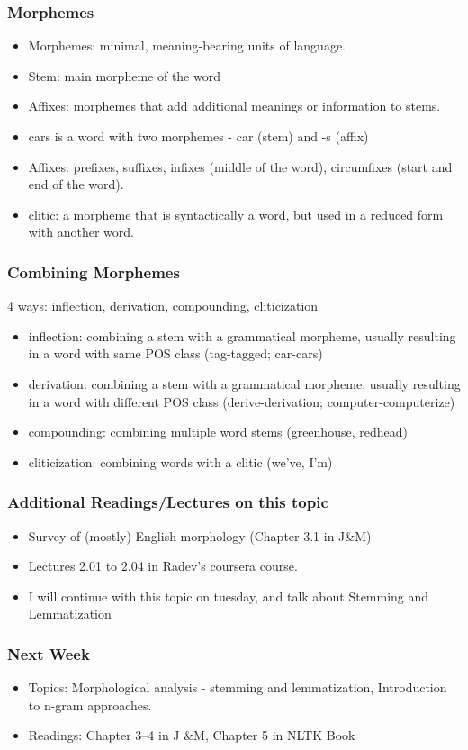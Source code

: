 \documentclass{beamer}
\begin{document}
\begin{frame}
\frametitle{Morphemes}
\begin{itemize}
\item Morphemes: minimal, meaning-bearing units of language.
\item Stem: main morpheme of the word
\item Affixes: morphemes that add additional meanings or information to stems.
\item cars is a word with two morphemes - car (stem) and -s (affix)
\item Affixes: prefixes, suffixes, infixes (middle of the word), circumfixes (start and end of the word). 
\item clitic: a morpheme that is syntactically a word, but used in a reduced form with another word.
\end{itemize}
\end{frame}

\begin{frame}
\frametitle{Combining Morphemes}
4 ways: inflection, derivation, compounding, cliticization
\begin{itemize}
\item inflection: combining a stem with a grammatical morpheme, usually resulting in a word with same POS class (tag-tagged; car-cars)
\item derivation: combining a stem with a grammatical morpheme, usually resulting in a word with different POS class (derive-derivation; computer-computerize)
\item compounding: combining multiple word stems (greenhouse, redhead)
\item cliticization: combining words with a clitic (we've, I'm)
\end{itemize}
\end{frame}

\begin{frame}
\frametitle{Additional Readings/Lectures on this topic}
\begin{itemize}
\item Survey of (mostly) English morphology (Chapter 3.1 in J\&M)
\item Lectures 2.01 to 2.04 in Radev's coursera course.
\item I will continue with this topic on tuesday, and talk about Stemming and Lemmatization
\end{itemize}
\end{frame}

\begin{frame}
\frametitle{Next Week}
\begin{itemize}
\item Topics: Morphological analysis - stemming and lemmatization, Introduction to n-gram approaches. 
\item Readings: Chapter 3--4 in J \&M, Chapter 5 in NLTK Book
\end{itemize}
\end{frame}
\end{document}
